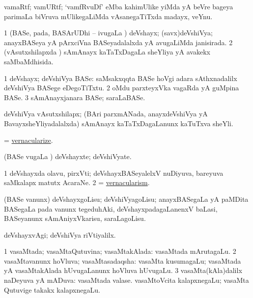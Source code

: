 \bentry
{} 
\gl{\nA}
\expl{}
\bmng
 vamaRtf; vamURtf; `vamfRvuDf' eMba kahimUlike yiMda yA beVre bageya parimaLa biVruva mUlikegaLiMda vAsanegaTiTxda madayx, veYnu. 
\emng
\eentry

\bentry
{} 
\gl{\gu}
\expl{}
\bmng
\bnum
\num{1} (BASe, pada, BASArUDhi -- ivugaLa \vi) deVshayx; (savx)deVshiVya; anayxBASeya yA pArxciVna BASeyadalalxda yA avugaLiMda janisirada. 
\num{2} (vAsutxshilapxda \vi) sAmAnayx kaTaTxDagaLa sheYliya yA avakekx saMbaMdhisida. 
\enum
\emng
\eentry

\bentry
{} 
\gl{\nA}
\expl{}
\bmng
\bnum
\num{1} deVshayx; deVshiVya BASe:  saMsakxqqta BASe hoVgi adara sAthxnadalilx deVshiVya BASege eDegoTiTxtu. 
\num{2} oMdu parxteyxVka vagaRda yA guMpina BASe. 
\num{3} sAmAnayxjanara BASe; saraLaBASe. 
\enum
\emng
\eentry

\bentry
{}
\gl{\nA}
\expl{}
\bmng
 deVshiVya vAsutxshilapx; (BAri parxmANada, anayxdeVshiVya yA BavayxsheYliyadalalxda) sAmAnayx kaTaTxDagaLanunx kaTuTxva sheYli. 
\emng
\eentry

\bentry
{} 
\gl{\sakirx}
\expl{}
\bmng
 = \hyperlink{vernacularize}{vernacularize}. 
\emng
\eentry

\bentry 
{} 
\gl{\nA}
\expl{}
\bmng
 (BASe \mo vugaLa \vi) deVshayxte; deVshiVyate. 
\emng
\eentry

\bentry
{} 
\gl{\nA}
\expl{}
\bmng
\bnum
\num{1} deVshayxda olavu, pirxVti; deVshayxBASeyalelxV nuDiyuva, bareyuva saMkalapx matutx AcaraNe. 
\num{2} = \hyperlink{vernacularism}{vernacularism}. 
\enum
\emng
\eentry

\bentry
{} 
\gl{\sakirx}
\expl{}
\bmng
 (BASe \mo vanunx) deVshayxgoLisu; deVshiVyagoLisu; anayxBASegaLa yA paMDita BASegaLa pada \mo vanunx tegeduhAki, deVshayxpadagaLanenxV baLasi, BASeyanunx sAmAniyxVkarisu, saraLagoLisu. 
\emng
\eentry

\bentry
{} 
\gl{\kirxvi}
\expl{}
\bmng
 deVshayxvAgi; deVshiVya riVtiyalilx. 
\emng
\eentry

\bentry
{} 
\gl{\gu}
\expl{}
\bmng
\bnum
\num{1} vasaMtada; vasaMtaQutuvina; vasaMtakAlada:  vasaMtada mArutagaLu. 
\num{2} vasaMtavanunx hoVluva; vasaMtasadaqsha:  vasaMta kusumagaLu; vasaMtada yA vasaMtakAlada hUvugaLanunx hoVluva hUvugaLu. 
\num{3} vasaMta(kAla)dalilx naDeyuva yA mADuva:  vasaMtada valase.  vasaMtoVcita kalapxnegaLu; vasaMta Qutuvige takakx kalapxnegaLu. 
\enum
\emng
\eentry


